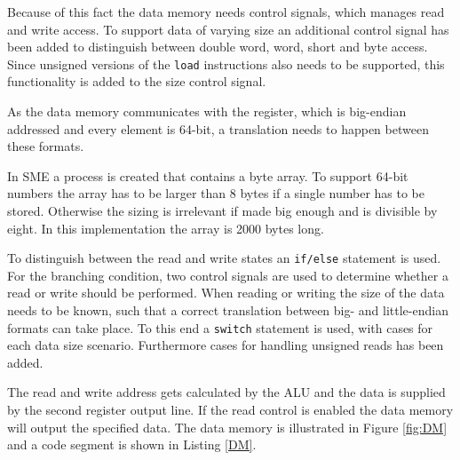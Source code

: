         Because of this fact the data memory needs control signals, which manages read and write access. To support data of varying size an additional control signal has been added to distinguish between double word, word, short and byte access. Since unsigned versions of the \texttt{load} instructions also needs to be supported, this functionality is added to the size control signal.
        
        As the data memory communicates with the register, which is big-endian addressed and every element is 64-bit, a translation needs to happen between these formats.
        
        In SME a process is created that contains a byte array. To support 64-bit numbers the array has to be larger than 8 bytes if a single number has to be stored. Otherwise the sizing is irrelevant if made big enough and is divisible by eight. In this implementation the array is 2000 bytes long.
        
        To distinguish between the read and write states an \texttt{if/else} statement is used. For the branching condition, two control signals are used to determine whether a read or write should be performed. When reading or writing the size of the data needs to be known, such that a correct translation between big- and little-endian formats can take place. To this end a \texttt{switch} statement is used, with cases for each data size scenario. Furthermore cases for handling unsigned reads has been added.
        
        The read and write address gets calculated by the ALU and the data is supplied by the second register output line. If the read control is enabled the data memory will output the specified data. The data memory is illustrated in Figure \ref{fig:DM} and a code segment is shown in Listing \ref{DM}.
        
